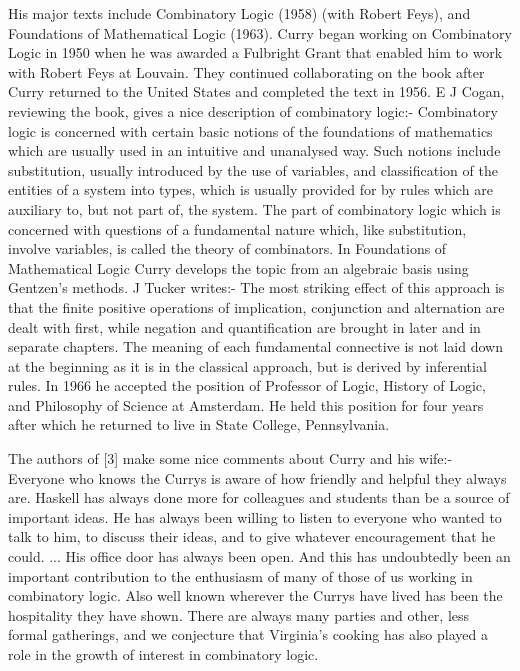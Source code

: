His major texts include Combinatory Logic (1958) (with Robert Feys), and Foundations of Mathematical Logic (1963). Curry began working on Combinatory Logic in 1950 when he was awarded a Fulbright Grant that enabled him to work with Robert Feys at Louvain. They continued collaborating on the book after Curry returned to the United States and completed the text in 1956. E J Cogan, reviewing the book, gives a nice description of combinatory logic:-
Combinatory logic is concerned with certain basic notions of the foundations of mathematics which are usually used in an intuitive and unanalysed way. Such notions include substitution, usually introduced by the use of variables, and classification of the entities of a system into types, which is usually provided for by rules which are auxiliary to, but not part of, the system. The part of combinatory logic which is concerned with questions of a fundamental nature which, like substitution, involve variables, is called the theory of combinators.
In Foundations of Mathematical Logic Curry develops the topic from an algebraic basis using Gentzen's methods. J Tucker writes:-
The most striking effect of this approach is that the finite positive operations of implication, conjunction and alternation are dealt with first, while negation and quantification are brought in later and in separate chapters. The meaning of each fundamental connective is not laid down at the beginning as it is in the classical approach, but is derived by inferential rules.
In 1966 he accepted the position of Professor of Logic, History of Logic, and Philosophy of Science at Amsterdam. He held this position for four years after which he returned to live in State College, Pennsylvania.

The authors of [3] make some nice comments about Curry and his wife:-
Everyone who knows the Currys is aware of how friendly and helpful they always are. Haskell has always done more for colleagues and students than be a source of important ideas. He has always been willing to listen to everyone who wanted to talk to him, to discuss their ideas, and to give whatever encouragement that he could. ... His office door has always been open. And this has undoubtedly been an important contribution to the enthusiasm of many of those of us working in combinatory logic. Also well known wherever the Currys have lived has been the hospitality they have shown. There are always many parties and other, less formal gatherings, and we conjecture that Virginia's cooking has also played a role in the growth of interest in combinatory logic.
